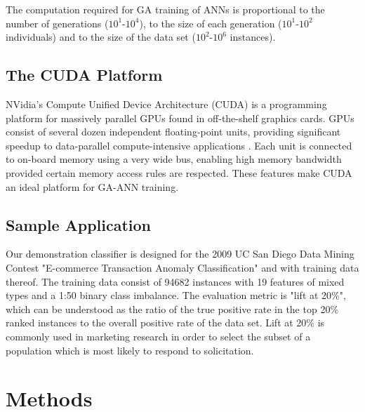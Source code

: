 \documentclass[11pt]{article}       %
\begin{document}
The computation required for GA training of ANNs is proportional to the number of generations ($10^1$-$10^4$), to the size of each generation ($10^1$-$10^2$ individuals) and to the size of the data set ($10^2$-$10^6$ instances).

\subsection{The CUDA Platform} \label{cuda}
NVidia's Compute Unified Device Architecture (CUDA) is a programming platform for massively parallel GPUs found in off-the-shelf graphics cards. GPUs consist of several dozen independent floating-point units, providing significant speedup to data-parallel compute-intensive applications \cite{cuda}. Each unit is connected to on-board memory using a very wide bus, enabling high memory bandwidth provided certain memory access rules are respected. These features make CUDA an ideal platform for GA-ANN training.

\subsection{Sample Application} \label{contest}
Our demonstration classifier is designed for the 2009 UC San Diego Data Mining Contest "E-commerce Transaction Anomaly Classification" \cite{UCSG-Contest} and with training data thereof. The training data consist of 94682 instances with 19 features of mixed types and a 1:50 binary class imbalance. The evaluation metric is "lift at 20\%", which can be understood as the ratio of the true positive rate in the top 20\% ranked instances to the overall positive rate of the data set.  Lift at 20\% is commonly used in marketing research in order to select the subset of a population which is most likely to respond to solicitation.

\section{Methods} \label{algimp}
\end{document}
